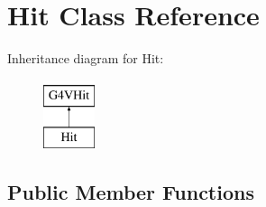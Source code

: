 \hypertarget{class_hit}{}\section{Hit Class Reference}
\label{class_hit}
Inheritance diagram for Hit\+:\begin{figure}[H]
\begin{center}
\leavevmode
\includegraphics[height=2.000000cm]{class_hit}
\end{center}
\end{figure}
\subsection*{Public Member Functions}
